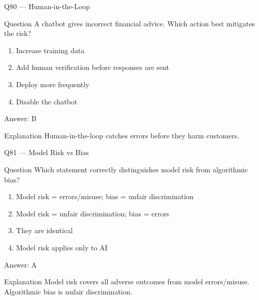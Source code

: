 \documentclass[aspectratio=169,8pt]{beamer}
\begin{document}
	\begin{frame}{Q80 --- Human-in-the-Loop}
		\begin{block}{Question}
			A chatbot gives incorrect financial advice. Which action best mitigates the risk?
		\end{block}
		\begin{enumerate}
			\item Increase training data
			\item Add human verification before responses are sent
			\item Deploy more frequently
			\item Disable the chatbot
		\end{enumerate}
		\begin{exampleblock}{Answer: B}\end{exampleblock}
		\begin{block}{Explanation}
			Human-in-the-loop catches errors before they harm customers.
		\end{block}
	\end{frame}
	
	\begin{frame}{Q81 --- Model Risk vs Bias}
		\begin{block}{Question}
			Which statement correctly distinguishes model risk from algorithmic bias?
		\end{block}
		\begin{enumerate}
			\item Model risk = errors/misuse; bias = unfair discrimination
			\item Model risk = unfair discrimination; bias = errors
			\item They are identical
			\item Model risk applies only to AI
		\end{enumerate}
		\begin{exampleblock}{Answer: A}\end{exampleblock}
		\begin{block}{Explanation}
			Model risk covers all adverse outcomes from model errors/misuse. Algorithmic bias is unfair discrimination.
		\end{block}
	\end{frame}
	
\end{document}
